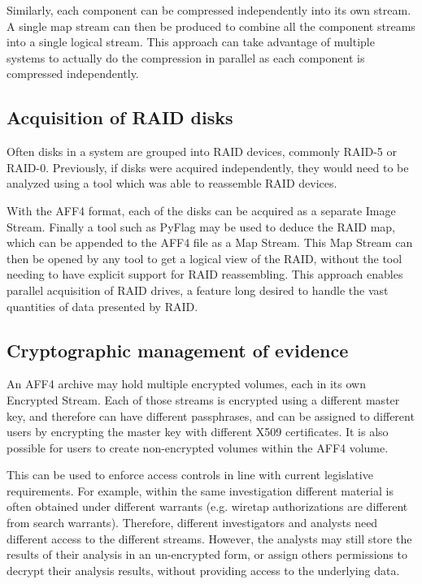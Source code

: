 \documentclass[10pt, conference]{IEEEtran}
\begin{document}
Similarly, each component can be compressed independently into its own
stream. A single map stream can then be produced to combine all the
component streams into a single logical stream. This approach can take
advantage of multiple systems to actually do the compression in
parallel as each component is compressed independently.

\subsection{Acquisition of RAID disks}
Often disks in a system are grouped into RAID devices, commonly RAID-5
or RAID-0. Previously, if disks were acquired independently, they
would need to be analyzed using a tool which was able to reassemble
RAID devices.

With the AFF4 format, each of the disks can be acquired as a separate
Image Stream. Finally a tool such as PyFlag \cite{pyflag_raid} may be
used to deduce the RAID map, which can be appended to the AFF4 file as
a Map Stream. This Map Stream can then be opened by any tool to get a
logical view of the RAID, without the tool needing to have explicit
support for RAID reassembling. This approach enables parallel
acquisition of RAID drives, a feature long desired to handle the vast
quantities of data presented by RAID.

\subsection{Cryptographic management of evidence}
An AFF4 archive may hold multiple encrypted volumes, each in its own
Encrypted Stream. Each of those streams is encrypted using a different
master key, and therefore can have different passphrases, and can be
assigned to different users by encrypting the master key with
different X509 certificates. It is also possible for users to create
non-encrypted volumes within the AFF4 volume.

This can be used to enforce access controls in line with current
legislative requirements. For example, within the same investigation
different material is often obtained under different warrants
(e.g. wiretap authorizations are different from search
warrants). Therefore, different investigators and analysts need
different access to the different streams. However, the analysts may
still store the results of their analysis in an un-encrypted form, or
assign others permissions to decrypt their analysis results, without
providing access to the underlying data. 
\end{document}
